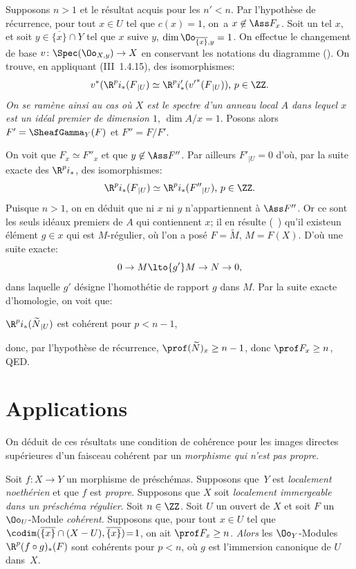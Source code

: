 Supposons $n>1$ et le r\'esultat acquis pour les $n'<n$. Par l'hypoth\`ese de r\'ecurrence, pour tout $x\in U$ tel que $c(x)=1$, on~a $x\not\in\Ass F_x$. Soit un tel $x$, et soit $y\in\overline{\{x\}}\cap Y$ tel que $x$ suive $y$, \ie $\dim\Oo_{\overline{\{x\}}, y}=1$. On effectue le changement de base $v\colon\Spec (\Oo_{X, y})\to X$ en conservant les notations du diagramme (). On trouve, en appliquant (\EGA III~1.4.15), des isomorphismes:
\[v^\ast(\R^pi_\ast(F{}_{|U}) \simeq \R^pi'_\ast({v'}^\ast(F{}_{|U}))\text{, }p\in\ZZ.
\]
\emph{On se ram\`ene ainsi au cas o\`u $X$ est le spectre d'un anneau local $A$ dans lequel $x$ est un id\'eal premier de dimension $1$}, \ie $\dim A/x=1$. Posons alors $F'=\SheafGamma_Y(F)$ et $F''=F/F'$.

\noindent On voit que $F_x\simeq F''_x$ et que $y\not\in \Ass F''$. Par ailleurs $F'{}_{|U}=0$ d'o\`u, par la suite exacte des $\R^pi_\ast$, des isomorphismes:
\[
\R^pi_\ast(F{}_{|U})\simeq \R^pi_\ast(F''{}_{|U})\text{, }p\in\ZZ.
\]
Puisque $n>1$, on en d\'eduit que ni $x$ ni $y$ n'appartiennent \`a $\Ass F''$. Or ce sont les seuls id\'eaux premiers de $A$ qui contiennent $x$; il en r\'esulte (~) qu'il existe\pageoriginale un \'el\'ement $g\in x$ qui est $M$-r\'egulier, o\`u l'on a pos\'e $F=\widetilde{M}$, $M=F(X)$. D'o\`u une suite exacte:
\[0\to M\lto{g'} M\to N \to 0,
\]
dans laquelle $g'$ d\'esigne l'homoth\'etie de rapport $g$ dans $M$. Par la suite exacte d'homologie, on voit que:

$\R^pi_\ast(\widetilde{N}{}_{|U})$ est coh\'erent pour $p<n-1$,

\noindent donc, par l'hypoth\`ese de r\'ecurrence, $\prof(\widetilde{N})_x\geq n-1$, donc $\prof F_x\geq n$, QED.

\section{Applications} \label{VIII.3}

On d\'eduit de ces r\'esultats une condition de coh\'erence pour les images directes sup\'erieures d'un faisceau coh\'erent par un \emph{morphisme qui n'est pas propre}.

\begin{theoreme} \label{VIII.3.1}
Soit $f\colon X\to Y$ un morphisme de pr\'esch\'emas. Supposons que~$Y$ est \emph{localement noeth\'erien} et que $f$ est \emph{propre}. Supposons que $X$ soit \emph{localement immergeable dans un pr\'esch\'ema r\'egulier}. Soit $n\in\ZZ$. Soit $U$ un ouvert de $X$ et soit $F$ un $\Oo_U$-Module \emph{coh\'erent}. Supposons que, pour tout $x\in U$ tel que \hbox{$\codim(\overline{\{x\}}\cap (X-U), \overline{\{x\}})\!=\!1$}, on ait $\prof F_x\geq n$. \emph{Alors} les $\Oo_Y$-Modules \hbox{$\R^p(f\circ g)_\ast(F)$} sont coh\'erents pour $p<n$, o\`u $g$ est l'immersion canonique de $U$ dans~$X$.
\end{theoreme}

